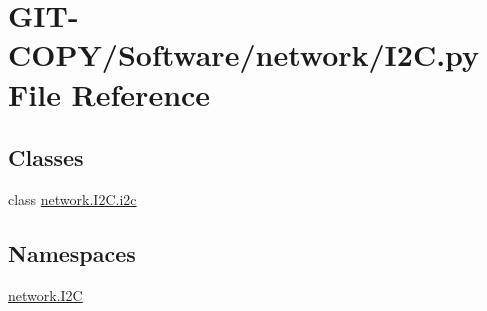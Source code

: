 \hypertarget{GIT-COPY_2Software_2network_2I2C_8py}{}\section{G\+I\+T-\/\+C\+O\+P\+Y/\+Software/network/\+I2\+C.py File Reference}
\label{GIT-COPY_2Software_2network_2I2C_8py}
\subsection*{Classes}
\begin{DoxyCompactItemize}
\item 
class \hyperlink{classnetwork_1_1I2C_1_1i2c}{network.\+I2\+C.\+i2c}
\end{DoxyCompactItemize}
\subsection*{Namespaces}
\begin{DoxyCompactItemize}
\item 
 \hyperlink{namespacenetwork_1_1I2C}{network.\+I2\+C}
\end{DoxyCompactItemize}
